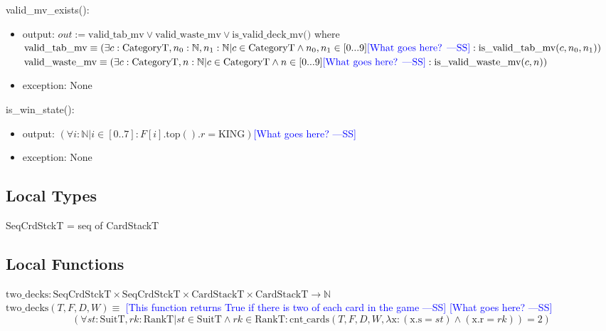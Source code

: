 \documentclass[12pt]{article}
\newcommand{\authornote}[3]{\textcolor{#1}{[#3 ---#2]}}
\newcommand{\authornote}[3]{}
\newcommand{\wss}[1]{\authornote{blue}{SS}{#1}}
\begin{document}
\noindent valid\_mv\_exists():
\begin{itemize}
\item output: $out := \text{valid\_tab\_mv} \vee \text{valid\_waste\_mv} \vee
  \text{is\_valid\_deck\_mv()}$ where\\

  $\text{valid\_tab\_mv} \equiv (\exists c: \text{CategoryT}, n_0: \mathbb{N},
  n_1: \mathbb{N} | c \in \text{CategoryT} \land n_0, n_1 \in [0...9] \text{\wss{What goes here?}}: \text{is\_valid\_tab\_mv}(c, n_0, n_1))$\\

  $\text{valid\_waste\_mv} \equiv (\exists c: \text{CategoryT}, n: \mathbb{N} | 
  c \in \text{CategoryT}  \land  n \in [0...9]  \text{\wss{What goes here?}}: \text{is\_valid\_waste\_mv}(c, n))$ 

\item exception: None

\end{itemize}

\noindent is\_win\_state():
\begin{itemize}
\item output: $(\forall i: \mathbb{N} | i \in [0..7] : F[i].\text{top}().r = \text{KING})$\wss{What goes here?}
\item exception: None

\end{itemize}

\subsection*{Local Types}

SeqCrdStckT = seq of CardStackT

\subsection*{Local Functions}

\noindent $\text{two\_decks} : \text{SeqCrdStckT} \times \text{SeqCrdStckT}
\times \text{CardStackT} \times \text{CardStackT} \rightarrow \mathbb{N}$\\
\noindent
$\text{two\_decks}(T, F, D, W) \equiv$ \wss{This function returns True if there
  is two of each card in the game}  \wss{What goes here?}
$$(\forall \mathit{st}: \text{SuitT}, \mathit{rk}:
\text{RankT} | \mathit{st} \in \text{SuitT} \wedge \mathit{rk} \in \text{RankT}
: \text{cnt\_cards}(T, F, D, W,  \lambda \text{x}: (\text{x.s} = st) \land (\text{x.r} = rk)) = 2)$$
\end{document}
